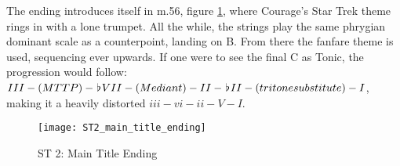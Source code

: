 The ending introduces itself in m.56, figure \ref{ST2_main_title_ending}, where Courage's Star Trek theme rings in with a lone trumpet. All the while, the strings play the same  phrygian dominant scale as a counterpoint, landing on B. From there the fanfare theme is used, sequencing ever upwards. If one were to see the final C as Tonic, the progression would follow: \(III-(MTTP)-\hspace*{0.18ex}\flat\hspace*{0.18ex}{VII}-(Mediant)-II-\hspace*{0.18ex}\flat\hspace*{0.18ex}{II}-(tritone substitute)-I\), making it a heavily distorted \(iii-vi-ii-V-I\). 

\clearpage
\begin{figure}
\center
\texttt{[image: ST2\_main\_title\_ending]}
	\caption{ST 2: Main Title Ending}
	\label{ST2_main_title_ending}
\end{figure}



\clearpage


